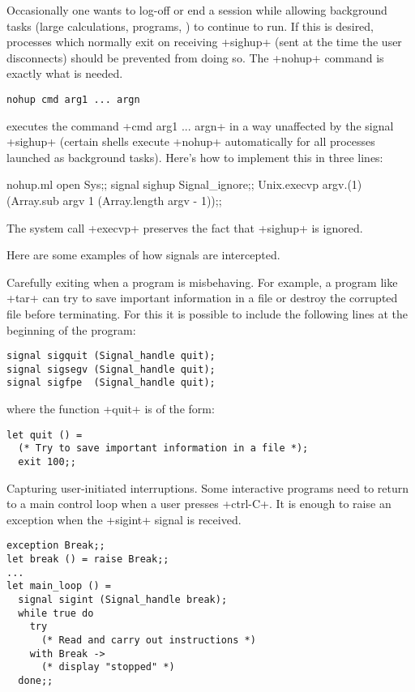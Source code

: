 \begin{example}
Occasionally one wants to log-off or end a session while allowing 
background tasks (large calculations,  programs, \etc) 
to continue to run.  If this is desired, processes which normally
exit on receiving \ml+sighup+ (sent at the time the user disconnects)
should be prevented from doing so. The \ml+nohup+
command is exactly what is needed.
\begin{lstlisting}
nohup cmd arg1 ... argn
\end{lstlisting}
executes the command \ml+cmd arg1 ... argn+ in a way unaffected by
the signal \ml+sighup+ (certain shells execute \ml+nohup+
automatically for all processes launched as background tasks).  Here's how
to implement this in three lines:
%
\begin{listingcodefile}{nohup.ml}
open Sys;;
signal sighup Signal_ignore;;
Unix.execvp argv.(1) (Array.sub argv 1 (Array.length argv - 1));;
\end{listingcodefile}
%
The system call \ml+execvp+ preserves the fact that \ml+sighup+ is ignored.
\end{example}

Here are some examples of how signals are intercepted.

\begin{example} 
Carefully exiting when a program is misbehaving. For example,
a program like \ml+tar+ can try to save important information
in a file or destroy the corrupted file before terminating.  For this 
it is possible to include the following lines at the beginning of the program:
%
\begin{lstlisting}
signal sigquit (Signal_handle quit);
signal sigsegv (Signal_handle quit);
signal sigfpe  (Signal_handle quit);
\end{lstlisting}
%
where the function \ml+quit+ is of the form:
%
\begin{lstlisting}
let quit () =
  (* Try to save important information in a file *);
  exit 100;;
\end{lstlisting}
\end{example}

\begin{example} 
Capturing user-initiated interruptions. Some interactive programs
need to return to a main control loop when a user
presses \ml+ctrl-C+.  It is enough to raise an exception when the
\ml+sigint+ signal is received.

%
\begin{lstlisting}
exception Break;;
let break () = raise Break;;
...
let main_loop () =
  signal sigint (Signal_handle break);
  while true do
    try
      (* Read and carry out instructions *)
    with Break ->
      (* display "stopped" *)
  done;;
\end{lstlisting}
\end{example}

